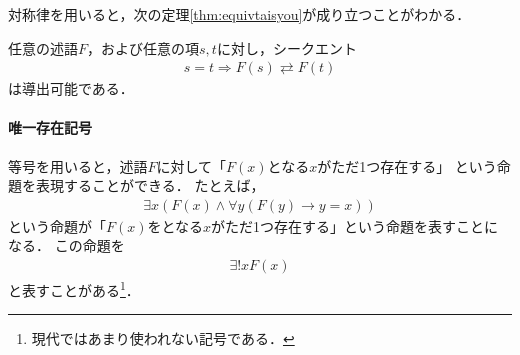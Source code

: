      対称律を用いると，次の定理\ref{thm:equivtaisyou}が成り立つことがわかる．
     \begin{thm} \label{thm:equivtaisyou}
       任意の述語$F$，および任意の項$s,  t$に対し，シークエント
       \begin{align}
         s = t \Longrightarrow F(s) \rightleftarrows F(t)
         \label{eq:equivtaisyou}
       \end{align}
       は導出可能である．
     \end{thm}

    \paragraph{唯一存在記号}
     等号を用いると，述語$F$に対して「$F(x)$となる$x$がただ1つ存在する」
     という命題を表現することができる．
     たとえば，
     \begin{align}
       \exists x ( F(x) \land \forall y (F(y) \to y=x))
       \label{eq:tadahitotu}
     \end{align}
     という命題が「$F(x)$をとなる$x$がただ1つ存在する」という命題を表すことになる．
     この命題を
     \begin{align}
       \exists ! x F(x)
       \label{eq:existsbikkuri}
     \end{align}
     と表すことがある\footnote{現代ではあまり使われない記号である．}．

